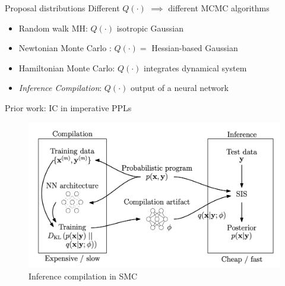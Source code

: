 \documentclass{beamer}
\begin{document}
\begin{frame}[fragile]{Proposal distributions}
    Different $Q(\cdot)$ $\implies$ different MCMC algorithms
    
    \begin{itemize}
        \item Random walk MH: $Q(\cdot)$ isotropic Gaussian
        \item Newtonian Monte Carlo \cite{arora2020newtonian}:
        $Q(\cdot) =$ Hessian-based Gaussian
        \item Hamiltonian Monte Carlo: $Q(\cdot)$ integrates dynamical system
        \item \emph{Inference Compilation}: $Q(\cdot)$ output of a neural network
    \end{itemize}
\end{frame}

\begin{frame}[fragile]{Prior work: IC in imperative PPLs}
	\begin{figure}
	    \centering
	    \includegraphics[width=0.7\linewidth]{figures/ic.png}
	    \caption{Inference compilation in SMC \cite{le2017inference}}
	\end{figure}
	
\end{frame}
\end{document}
